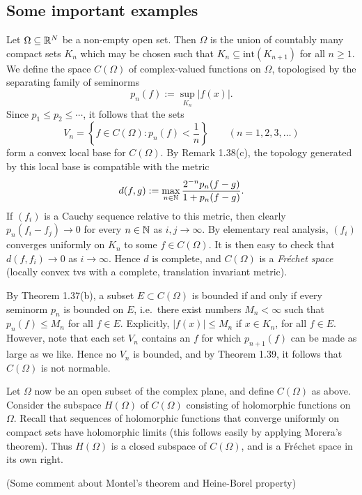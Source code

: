 \subsection{Some important examples}

\begin{example}
	Let $\Omega \subseteq \mathbb{R}^N$ be a non-empty open set. Then $\Omega$ is the union of countably many compact sets $K_n$ which may be chosen such that $K_n \subseteq \text{int}(K_{n+1})$ for all $n \ge 1$. We define the space $C(\Omega)$ of complex-valued functions on $\Omega$, topologised by the separating family of seminorms
	\begin{equation*}
		p_n(f) := \sup_{K_n} |f(x)|.
	\end{equation*}
	Since $p_1 \le p_2 \le \cdots$, it follows that the sets
	\begin{equation*}
		V_n = \left\{ f \in C(\Omega) : p_n(f) < \frac{1}{n} \right\} \qquad (n=1,2,3,\ldots)
	\end{equation*}
	form a convex local base for $C(\Omega)$. By Remark 1.38(c), the topology generated by this local base is compatible with the metric
	\begin{equation*}
		d(f,g) := \max_{n \in \mathbb{N}} \frac{2^{-n} p_n(f-g)}{1+p_n(f-g)}.
	\end{equation*}
	If $(f_i)$ is a Cauchy sequence relative to this metric, then clearly $p_n(f_i - f_j) \to 0$ for every $n \in \mathbb{N}$ as $i,j \to \infty$. By elementary real analysis, $(f_i)$ converges uniformly on $K_n$ to some $f \in C(\Omega)$. It is then easy to check that $d(f, f_i) \to 0$ as $i \to \infty$. Hence $d$ is complete, and $C(\Omega)$ is a \emph{Fr\'{e}chet space} (locally convex tvs with a complete, translation invariant metric).
	
	By Theorem 1.37(b), a subset $E \subset C(\Omega)$ is bounded if and only if every seminorm $p_n$ is bounded on $E$, i.e.\ there exist numbers $M_n < \infty$ such that $p_n(f) \le M_n$ for all $f \in E$. Explicitly, $|f(x)| \le M_n$ if $x \in K_n$, for all $f \in E$. However, note that each set $V_n$ contains an $f$ for which $p_{n+1}(f)$ can be made as large as we like. Hence no $V_n$ is bounded, and by Theorem 1.39, it follows that $C(\Omega)$ is not normable.
\end{example}

\begin{example}
	Let $\Omega$ now be an open subset of the complex plane, and define $C(\Omega)$ as above. Consider the subspace $H(\Omega)$ of $C(\Omega)$ consisting of holomorphic functions on $\Omega$. Recall that sequences of holomorphic functions that converge uniformly on compact sets have holomorphic limits (this follows easily by applying Morera's theorem). Thus $H(\Omega)$ is a closed subspace of $C(\Omega)$, and is a Fr\'{e}chet space in its own right.
	
	(Some comment about Montel's theorem and Heine-Borel property)
\end{example}

